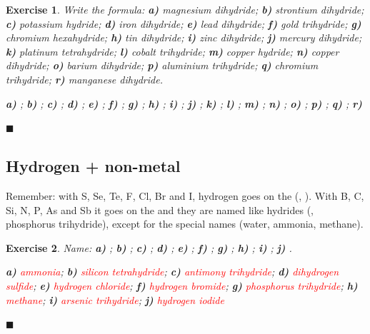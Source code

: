 \documentclass[12pt]{article}
\theoremstyle{mygreennumbox}
\newtheorem{ejercicioT}{Exercise}[section]
\newenvironment{exercise}{\begin{eBoxmygreen}\begin{ejercicioT}}{\hfill{\color{mygreen}\tiny\ensuremath{\blacksquare}}\end{ejercicioT}\end{eBoxmygreen}}
\begin{document}
\begin{exercise}
    Write the formula: \textbf{a)} magnesium dihydride; \textbf{b)} strontium dihydride; \textbf{c)} potassium hydride; \textbf{d)} iron dihydride; \textbf{e)} lead dihydride; \textbf{f)} gold trihydride; \textbf{g)} chromium hexahydride; \textbf{h)} tin dihydride; \textbf{i)} zinc dihydride; \textbf{j)} mercury dihydride; \textbf{k)} platinum tetrahydride; \textbf{l)} cobalt trihydride; \textbf{m)} copper hydride; \textbf{n)} copper dihydride; \textbf{o)} barium dihydride; \textbf{p)} aluminium trihydride; \textbf{q)} chromium trihydride; \textbf{r)} manganese dihydride.
    \begin{solu}
        \textbf{a)} \textcolor{red}{}; \textbf{b)} \textcolor{red}{}; \textbf{c)} \textcolor{red}{}; \textbf{d)} \textcolor{red}{}; \textbf{e)} \textcolor{red}{}; \textbf{f)} \textcolor{red}{}; \textbf{g)} \textcolor{red}{}; \textbf{h)} \textcolor{red}{}; \textbf{i)} \textcolor{red}{}; \textbf{j)} \textcolor{red}{}; \textbf{k)} \textcolor{red}{}; \textbf{l)} \textcolor{red}{}; \textbf{m)} \textcolor{red}{}; \textbf{n)} \textcolor{red}{}; \textbf{o)} \textcolor{red}{}; \textbf{p)} \textcolor{red}{}; \textbf{q)} \textcolor{red}{}; \textbf{r)} \textcolor{red}{}
    \end{solu}
\end{exercise}

\subsection{Hydrogen + non-metal}

Remember: with S, Se, Te, F, Cl, Br and I, hydrogen goes on the  (, ). With B, C, Si, N, P, As and Sb it goes on the  and they are named like hydrides (, phosphorus trihydride), except for the special names (water, ammonia, methane).

\begin{exercise}
    Name: \textbf{a)} ; \textbf{b)} ; \textbf{c)} ; \textbf{d)} ; \textbf{e)} ; \textbf{f)} ; \textbf{g)} ; \textbf{h)} ; \textbf{i)} ; \textbf{j)} .
    \begin{solu}
        \textbf{a)} \textcolor{red}{ammonia}; \textbf{b)} \textcolor{red}{silicon tetrahydride}; \textbf{c)} \textcolor{red}{antimony trihydride}; \textbf{d)} \textcolor{red}{dihydrogen sulfide}; \textbf{e)} \textcolor{red}{hydrogen chloride}; \textbf{f)} \textcolor{red}{hydrogen bromide}; \textbf{g)} \textcolor{red}{phosphorus trihydride}; \textbf{h)} \textcolor{red}{methane}; \textbf{i)} \textcolor{red}{arsenic trihydride}; \textbf{j)} \textcolor{red}{hydrogen iodide}
    \end{solu}
\end{exercise}
\end{document}
